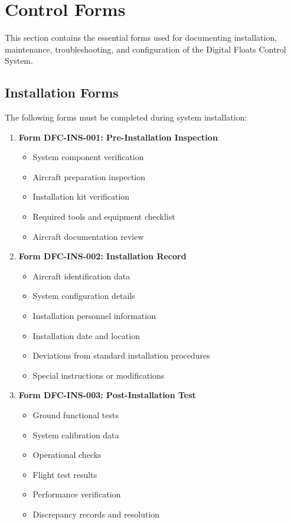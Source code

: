 \documentclass[12pt,a4paper,twoside,openright]{book}
\begin{document}
\section{Control Forms}

This section contains the essential forms used for documenting installation, maintenance, troubleshooting, and configuration of the Digital Floats Control System.

\subsection{Installation Forms}

The following forms must be completed during system installation:

\begin{enumerate}
    \item \textbf{Form DFC-INS-001: Pre-Installation Inspection}
    \begin{itemize}
        \item System component verification
        \item Aircraft preparation inspection
        \item Installation kit verification
        \item Required tools and equipment checklist
        \item Aircraft documentation review
    \end{itemize}
    
    \item \textbf{Form DFC-INS-002: Installation Record}
    \begin{itemize}
        \item Aircraft identification data
        \item System configuration details
        \item Installation personnel information
        \item Installation date and location
        \item Deviations from standard installation procedures
        \item Special instructions or modifications
    \end{itemize}
    
    \item \textbf{Form DFC-INS-003: Post-Installation Test}
    \begin{itemize}
        \item Ground functional tests
        \item System calibration data
        \item Operational checks
        \item Flight test results
        \item Performance verification
        \item Discrepancy records and resolution
    \end{itemize}
    

\end{enumerate}
\end{document}
